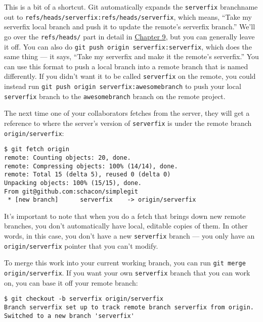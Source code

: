 \documentclass[a4paper]{book}
\newcounter{tab}[chapter]
\newcommand{\prechap}{Chapter }
\newcommand{\postchap}{}
\newcommand{\chapref}[1]{\hyperref[chap:#1]{\prechap #1\postchap}}
\begin{document}
This is a bit of a shortcut. Git automatically expands the \texttt{serverfix} branchname out to \texttt{refs/heads/serverfix:refs/heads/serverfix}, which means, “Take my serverfix local branch and push it to update the remote's serverfix branch.” We'll go over the \texttt{refs/heads/} part in detail in \chapref{9}, but you can generally leave it off. You can also do \texttt{git push origin serverfix:serverfix}, which does the same thing --- it says, “Take my serverfix and make it the remote's serverfix.” You can use this format to push a local branch into a remote branch that is named differently. If you didn't want it to be called \texttt{serverfix} on the remote, you could instead run \texttt{git push origin serverfix:awesomebranch} to push your local \texttt{serverfix} branch to the \texttt{awesomebranch} branch on the remote project.

The next time one of your collaborators fetches from the server, they will get a reference to where the server's version of \texttt{serverfix} is under the remote branch \texttt{origin/serverfix}:

\begin{shaded}\begin{verbatim}
$ git fetch origin
remote: Counting objects: 20, done.
remote: Compressing objects: 100% (14/14), done.
remote: Total 15 (delta 5), reused 0 (delta 0)
Unpacking objects: 100% (15/15), done.
From git@github.com:schacon/simplegit
 * [new branch]      serverfix    -> origin/serverfix
\end{verbatim}\end{shaded}

It's important to note that when you do a fetch that brings down new remote branches, you don't automatically have local, editable copies of them. In other words, in this case, you don't have a new \texttt{serverfix} branch --- you only have an \texttt{origin/serverfix} pointer that you can't modify.

To merge this work into your current working branch, you can run \texttt{git merge origin/serverfix}. If you want your own \texttt{serverfix} branch that you can work on, you can base it off your remote branch:

\begin{shaded}\begin{verbatim}
$ git checkout -b serverfix origin/serverfix
Branch serverfix set up to track remote branch serverfix from origin.
Switched to a new branch 'serverfix'
\end{verbatim}\end{shaded}
\end{document}
